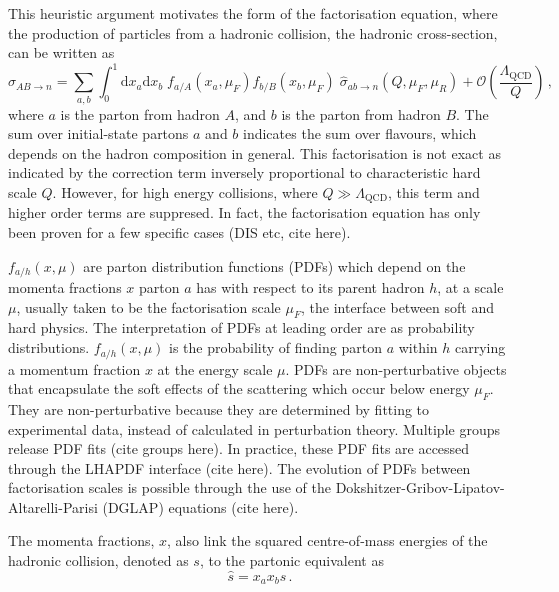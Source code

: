 \documentclass[main.tex]{subfiles}
\begin{document}
    This heuristic argument motivates the form of
    the factorisation equation, where the production of
    particles from a hadronic collision, the hadronic
    cross-section, can be written as
    \begin{equation}\label{eqn:hadronic_cs}
        \sigma_{AB \rightarrow n} = \sum_{a, b}\int_{0}^{1} \mathrm{d}x_{a}\mathrm{d}x_{b} \; f_{a/A}(x_{a},\mu_{F})f_{b/B}(x_{b}, \mu_{F}) \; \hat{\sigma}_{ab \rightarrow n}(Q, \mu_{F}, \mu_{R}) + \mathcal{O}\left(\dfrac{\Lambda_{\mathrm{QCD}}}{Q}\right)\, ,
    \end{equation}
    where $a$ is the parton from hadron $A$,
    and $b$ is the parton from hadron $B$.
    The sum over initial-state partons $a$ and $b$
    indicates the sum over flavours, which depends
    on the hadron composition in general.
    This factorisation is not exact as indicated by the
    correction term inversely proportional to characteristic
    hard scale $Q$. However, for high energy collisions, where
    $Q \gg \Lambda_{\mathrm{QCD}}$, this term and higher order
    terms are suppresed.
    In fact, the factorisation equation has only been
    proven for a few specific cases (DIS etc, cite here).

    $f_{a/h}(x, \mu)$ are parton distribution functions
    (PDFs) which depend on the momenta fractions $x$ parton $a$
    has with respect to its parent hadron $h$, at a scale $\mu$,
    usually taken to be the factorisation scale $\mu_{F}$,
    the interface between soft and hard physics.
    The interpretation of PDFs at leading order are
    as probability distributions. $f_{a/h}(x, \mu)$ is
    the probability of finding parton $a$ within $h$
    carrying a momentum fraction $x$ at the energy scale $\mu$.
    PDFs are non-perturbative objects that encapsulate
    the soft effects of the scattering which occur below energy
    $\mu_{F}$. They are non-perturbative because
    they are determined by fitting to experimental data,
    instead of calculated in perturbation theory.
    Multiple groups release PDF fits (cite groups here).
    In practice, these PDF fits
    are accessed through the LHAPDF interface (cite here).
    The evolution of PDFs between factorisation scales is possible
    through the use of the Dokshitzer-Gribov-Lipatov-Altarelli-Parisi (DGLAP)
    equations (cite here).

    The momenta fractions, $x$, also link the
    squared centre-of-mass energies of the hadronic collision,
    denoted as $s$, to the partonic equivalent as
    \begin{equation}\label{eqn:E_cm_partonic}
        \hat{s} = x_{a}x_{b}s \, .
    \end{equation}
\end{document}
